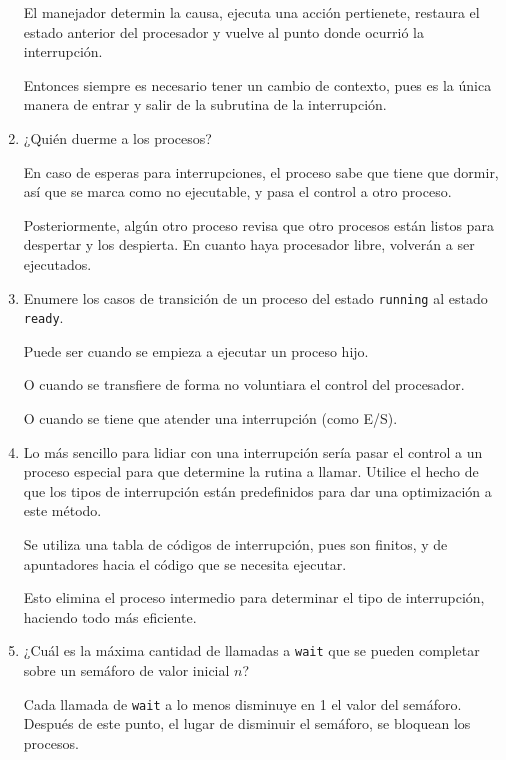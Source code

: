 \documentclass{article}
\begin{document}
\begin{enumerate}
        El manejador determin la causa, ejecuta una acción pertienete, restaura
        el estado anterior del procesador y vuelve al punto donde ocurrió la 
        interrupción.

        Entonces siempre es necesario tener un cambio de contexto, pues es la 
        única manera de entrar y salir de la subrutina de la interrupción.

        \item ¿Quién duerme a los procesos?

        En caso de esperas para interrupciones, el proceso sabe que tiene que 
        dormir, así que se marca como no ejecutable, y pasa el control a otro 
        proceso.

        Posteriormente, algún otro proceso revisa que otro procesos están listos
        para despertar y los despierta. En cuanto haya procesador libre, 
        volverán a ser ejecutados.

        \item Enumere los casos de transición de un proceso del estado 
        \texttt{running} al estado \texttt{ready}.

        Puede ser cuando se empieza a ejecutar un proceso hijo.

        O cuando se transfiere de forma no voluntiara el control del procesador.

        O cuando se tiene que atender una interrupción (como E/S).

        \item Lo más sencillo para lidiar con una interrupción sería pasar el 
        control a un proceso especial para que determine la rutina a llamar.
        Utilice el hecho de que los tipos de interrupción están predefinidos 
        para dar una optimización a este método.

        Se utiliza una tabla de códigos de interrupción, pues son finitos, y de 
        apuntadores hacia el código que se necesita ejecutar.

        Esto elimina el proceso intermedio para determinar el tipo de 
        interrupción, haciendo todo más eficiente.

        \item ¿Cuál es la máxima cantidad de llamadas a \texttt{wait} que se 
        pueden completar sobre un semáforo de valor inicial $n$?

        Cada llamada de \texttt{wait} a lo menos disminuye en 1 el valor del 
        semáforo. Después de este punto, el lugar de disminuir el semáforo, se
        bloquean los procesos.


\end{enumerate}
\end{document}
